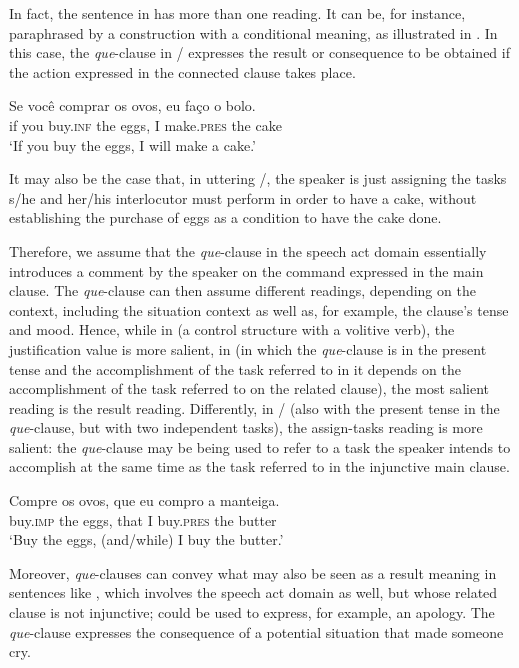 \documentclass[output=paper,colorlinks,citecolor=brown,
]{langscibook}
\begin{document}
In fact, the sentence in  has more than one reading. It can be, for instance, paraphrased by a construction with a conditional meaning, as illustrated in . In this case, the \textit{que}-clause in / expresses the result or consequence to be obtained if the action expressed in the connected clause takes place.
 
\ea \label{ex:matos:ovos4}
\gll Se você comprar os ovos, eu faço o bolo.\\ 
	 if you buy.\textsc{inf} the eggs, I make.\textsc{pres} the cake\\
\glt ‘If you buy the eggs, I will make a cake.’
\z 

It may also be the case that, in uttering /, the speaker is just assigning the tasks s/he and her/his interlocutor must perform in order to have a cake, without establishing the purchase of eggs as a condition to have the cake done. 
 
Therefore, we assume that the \textit{que}-clause in the speech act domain essentially introduces a comment by the speaker on the command expressed in the main clause. The \textit{que}-clause can then assume different readings, depending on the context, including the situation context as well as, for example, the clause’s tense and mood. Hence, while in  (a control structure with a volitive verb), the justification value is more salient, in  (in which the \textit{que}-clause is in the present tense and the accomplishment of the task referred to in it depends on the accomplishment of the task referred to on the related clause), the most salient reading is the result reading. Differently, in / (also with the present tense in the \textit{que}-clause, but with two independent tasks), the assign-tasks reading is more salient: the \textit{que}-clause may be being used to refer to a task the speaker intends to accomplish at the same time as the task referred to in the injunctive main clause. 

\ea \label{ex:matos:ovos5}
\gll Compre os ovos, que eu compro a manteiga.\\
	buy.\textsc{imp} the eggs, that I buy.\textsc{pres} the butter\\
\glt ‘Buy the eggs, (and/while) I buy the butter.’
\z 

Moreover, \textit{que}-clauses can convey what may also be seen as a result meaning in sentences like , which involves the speech act domain as well, but whose related clause is not injunctive;  could be used to express, for example, an apology. The \textit{que}-clause expresses the consequence of a potential situation that made someone cry.
\end{document}
